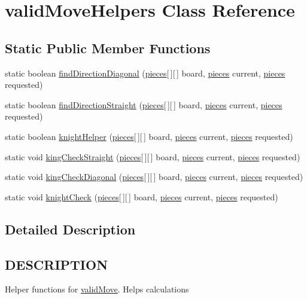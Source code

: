 \hypertarget{classvalidMoveHelpers}{\section{valid\-Move\-Helpers Class Reference}
\label{classvalidMoveHelpers}
}
\subsection*{Static Public Member Functions}
\begin{DoxyCompactItemize}
\item 
static boolean \hyperlink{classvalidMoveHelpers_abebb16f9d6e712f9b4faf303212fc6c5}{find\-Direction\-Diagonal} (\hyperlink{classpieces}{pieces}\mbox{[}$\,$\mbox{]}\mbox{[}$\,$\mbox{]} board, \hyperlink{classpieces}{pieces} current, \hyperlink{classpieces}{pieces} requested)
\item 
static boolean \hyperlink{classvalidMoveHelpers_addc359311febcf3cd8577ba03943bb54}{find\-Direction\-Straight} (\hyperlink{classpieces}{pieces}\mbox{[}$\,$\mbox{]}\mbox{[}$\,$\mbox{]} board, \hyperlink{classpieces}{pieces} current, \hyperlink{classpieces}{pieces} requested)
\item 
static boolean \hyperlink{classvalidMoveHelpers_a08434de9eceaf32133c26cc9eb7ce955}{knight\-Helper} (\hyperlink{classpieces}{pieces}\mbox{[}$\,$\mbox{]}\mbox{[}$\,$\mbox{]} board, \hyperlink{classpieces}{pieces} current, \hyperlink{classpieces}{pieces} requested)
\item 
static void \hyperlink{classvalidMoveHelpers_ac175ec02ffe0bd83ab765e2d9eb1fd85}{king\-Check\-Straight} (\hyperlink{classpieces}{pieces}\mbox{[}$\,$\mbox{]}\mbox{[}$\,$\mbox{]} board, \hyperlink{classpieces}{pieces} current, \hyperlink{classpieces}{pieces} requested)
\item 
static void \hyperlink{classvalidMoveHelpers_a6d312c237553af4824dfc44893b83bcf}{king\-Check\-Diagonal} (\hyperlink{classpieces}{pieces}\mbox{[}$\,$\mbox{]}\mbox{[}$\,$\mbox{]} board, \hyperlink{classpieces}{pieces} current, \hyperlink{classpieces}{pieces} requested)
\item 
static void \hyperlink{classvalidMoveHelpers_af369e45d918eeee3db657652e520fef7}{knight\-Check} (\hyperlink{classpieces}{pieces}\mbox{[}$\,$\mbox{]}\mbox{[}$\,$\mbox{]} board, \hyperlink{classpieces}{pieces} current, \hyperlink{classpieces}{pieces} requested)
\end{DoxyCompactItemize}


\subsection{Detailed Description}
\hypertarget{classvalidMoveTest_DESCRIPTION}{}\subsection{D\-E\-S\-C\-R\-I\-P\-T\-I\-O\-N}\label{classvalidMoveTest_DESCRIPTION}
Helper functions for \hyperlink{classvalidMove}{valid\-Move}. Helps calculations 

